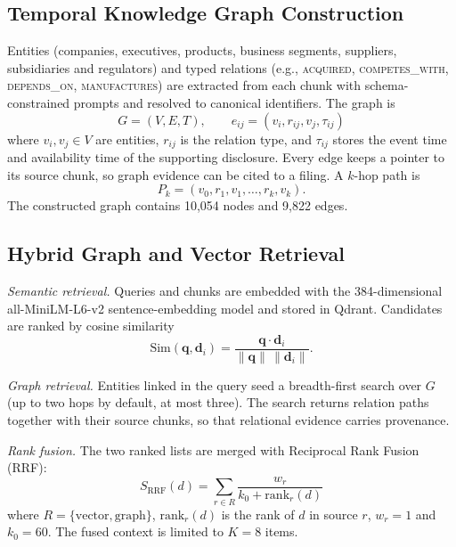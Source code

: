 \documentclass[conference]{IEEEtran}
\begin{document}
\subsection{Temporal Knowledge Graph Construction}
Entities (companies, executives, products, business segments, suppliers, subsidiaries and regulators) and typed relations (e.g., \textsc{acquired}, \textsc{competes\_with}, \textsc{depends\_on}, \textsc{manufactures}) are extracted from each chunk with schema-constrained prompts and resolved to canonical identifiers. The graph is
\begin{equation}
G = (V, E, T), \qquad e_{ij} = (v_i, r_{ij}, v_j, \tau_{ij})
\end{equation}
where $v_i, v_j \in V$ are entities, $r_{ij}$ is the relation type, and $\tau_{ij}$ stores the event time and availability time of the supporting disclosure. Every edge keeps a pointer to its source chunk, so graph evidence can be cited to a filing. A $k$-hop path is
\begin{equation}
P_k = (v_0, r_1, v_1, \dots, r_k, v_k).
\end{equation}
The constructed graph contains 10,054 nodes and 9,822 edges.

\subsection{Hybrid Graph and Vector Retrieval}
\textit{Semantic retrieval.} Queries and chunks are embedded with the 384-dimensional all-MiniLM-L6-v2 sentence-embedding model and stored in Qdrant. Candidates are ranked by cosine similarity
\begin{equation}
\mathrm{Sim}(\mathbf{q},\mathbf{d}_i) = \frac{\mathbf{q}\cdot\mathbf{d}_i}{\|\mathbf{q}\|\,\|\mathbf{d}_i\|}.
\end{equation}

\textit{Graph retrieval.} Entities linked in the query seed a breadth-first search over $G$ (up to two hops by default, at most three). The search returns relation paths together with their source chunks, so that relational evidence carries provenance.

\textit{Rank fusion.} The two ranked lists are merged with Reciprocal Rank Fusion (RRF):
\begin{equation}
S_{\mathrm{RRF}}(d) = \sum_{r\in R} \frac{w_r}{k_0 + \mathrm{rank}_r(d)}
\end{equation}
where $R=\{\text{vector},\text{graph}\}$, $\mathrm{rank}_r(d)$ is the rank of $d$ in source $r$, $w_r=1$ and $k_0=60$. The fused context is limited to $K=8$ items.
\end{document}
